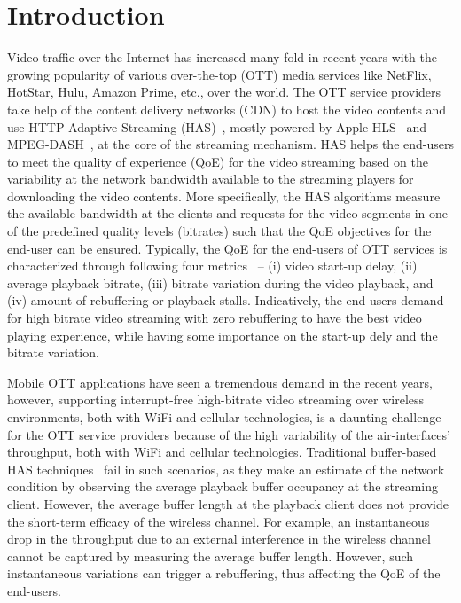 \section{Introduction}\label{sec:chap05:intro}
Video traffic over the Internet has increased many-fold in recent years with the growing popularity of various over-the-top (OTT) media services like NetFlix, HotStar, Hulu, Amazon Prime, etc., over the world. The OTT service providers take help of the content delivery networks (CDN) to host the video contents and use HTTP Adaptive Streaming (HAS)~\cite{}, mostly powered by Apple HLS~\cite{} and MPEG-DASH~\cite{}, at the core of the streaming mechanism. HAS helps the end-users to meet the quality of experience (QoE) for the video streaming based on the variability at the network bandwidth available to the streaming players for downloading the video contents. More specifically, the HAS algorithms measure the available bandwidth at the clients and requests for the video segments in one of the predefined quality levels (bitrates) such that the QoE objectives for the end-user can be ensured. Typically, the QoE for the end-users of OTT services is characterized through following four metrics~\cite{} -- (i) video start-up delay, (ii) average playback bitrate, (iii) bitrate variation during the video playback, and (iv) amount of rebuffering or playback-stalls. Indicatively, the end-users demand for high bitrate video streaming with zero rebuffering to have the best video playing experience, while having some importance on the start-up dely and the bitrate variation. 

Mobile OTT applications have seen a tremendous demand in the recent years, however, supporting interrupt-free high-bitrate video streaming over wireless environments, both with WiFi and cellular technologies, is a daunting challenge for the OTT service providers because of the high variability of the air-interfaces' throughput, both with WiFi and cellular technologies. Traditional buffer-based HAS techniques~\cite{} fail in such scenarios, as they make an estimate of the network condition by observing the average playback buffer occupancy at the streaming client. However, the average buffer length at the playback client does not provide the short-term efficacy of the wireless channel. For example, an instantaneous drop in the throughput due to an external interference in the wireless channel cannot be captured by measuring the average buffer length. However, such instantaneous variations can trigger a rebuffering, thus affecting the QoE of the end-users.  

